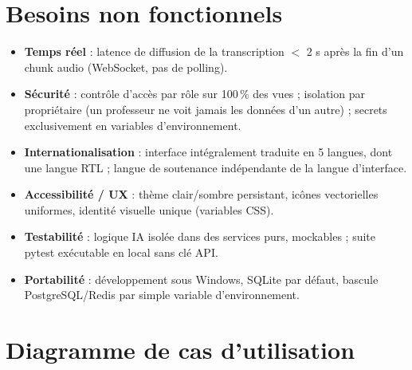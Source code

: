 \documentclass[12pt,a4paper]{report}
\begin{document}
\section{Besoins non fonctionnels}

\begin{itemize}
  \item \textbf{Temps réel} : latence de diffusion de la transcription $<$ 2 s
        après la fin d'un chunk audio (WebSocket, pas de polling).
  \item \textbf{Sécurité} : contrôle d'accès par rôle sur 100\,\% des vues ;
        isolation par propriétaire (un professeur ne voit jamais les données
        d'un autre) ; secrets exclusivement en variables d'environnement.
  \item \textbf{Internationalisation} : interface intégralement traduite en
        5 langues, dont une langue RTL ; langue de soutenance indépendante de la
        langue d'interface.
  \item \textbf{Accessibilité / UX} : thème clair/sombre persistant, icônes
        vectorielles uniformes, identité visuelle unique (variables CSS).
  \item \textbf{Testabilité} : logique IA isolée dans des services purs,
        mockables ; suite pytest exécutable en local sans clé API.
  \item \textbf{Portabilité} : développement sous Windows, SQLite par défaut,
        bascule PostgreSQL/Redis par simple variable d'environnement.
\end{itemize}

\section{Diagramme de cas d'utilisation}
\end{document}
